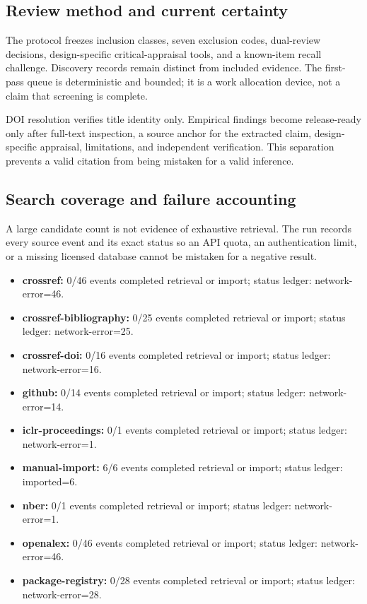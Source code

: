 \documentclass[11pt]{article}
\providecommand{\tightlist}{\setlength{\itemsep}{0pt}\setlength{\parskip}{0pt}}
\begin{document}
\hypertarget{review-method-and-current-certainty}{%
\subsection{Review method and current certainty}\label{review-method-and-current-certainty}}

The protocol freezes inclusion classes, seven exclusion codes, dual-review decisions, design-specific critical-appraisal tools, and a known-item recall challenge. Discovery records remain distinct from included evidence. The first-pass queue is deterministic and bounded; it is a work allocation device, not a claim that screening is complete.

DOI resolution verifies title identity only. Empirical findings become release-ready only after full-text inspection, a source anchor for the extracted claim, design-specific appraisal, limitations, and independent verification. This separation prevents a valid citation from being mistaken for a valid inference.

\hypertarget{search-coverage-and-failure-accounting}{%
\subsection{Search coverage and failure accounting}\label{search-coverage-and-failure-accounting}}

A large candidate count is not evidence of exhaustive retrieval. The run records every source event and its exact status so an API quota, an authentication limit, or a missing licensed database cannot be mistaken for a negative result.

\begin{itemize}
\tightlist
\item
  \textbf{crossref:} 0/46 events completed retrieval or import; status ledger: network-error=46.
\item
  \textbf{crossref-bibliography:} 0/25 events completed retrieval or import; status ledger: network-error=25.
\item
  \textbf{crossref-doi:} 0/16 events completed retrieval or import; status ledger: network-error=16.
\item
  \textbf{github:} 0/14 events completed retrieval or import; status ledger: network-error=14.
\item
  \textbf{iclr-proceedings:} 0/1 events completed retrieval or import; status ledger: network-error=1.
\item
  \textbf{manual-import:} 6/6 events completed retrieval or import; status ledger: imported=6.
\item
  \textbf{nber:} 0/1 events completed retrieval or import; status ledger: network-error=1.
\item
  \textbf{openalex:} 0/46 events completed retrieval or import; status ledger: network-error=46.
\item
  \textbf{package-registry:} 0/28 events completed retrieval or import; status ledger: network-error=28.
\end{itemize}
\end{document}
